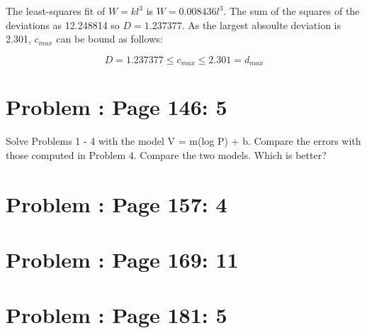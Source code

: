 \documentclass[]{article}
\begin{document}
The least-squares fit of \(W = kl^3\) is \(W = 0.008436l^3\). The sum of
the squares of the deviations as 12.248814 so \(D = 1.237377\). As the
largest absoulte deviation is 2.301, \(c_{max}\) can be bound as
follows:

\[D = 1.237377 \leq c_{max} \leq 2.301 = d_{max}\]

\section{Problem : Page 146: 5}\label{problem-page-146-5}

Solve Problems 1 - 4 with the model V = m(log P) + b. Compare the errors
with those computed in Problem 4. Compare the two models. Which is
better?

\section{Problem : Page 157: 4}\label{problem-page-157-4}

\section{Problem : Page 169: 11}\label{problem-page-169-11}

\section{Problem : Page 181: 5}\label{problem-page-181-5}
\end{document}
